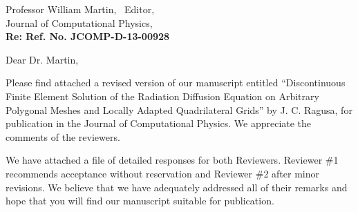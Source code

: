 \begin{letter}{Professor William Martin, \  Editor,\\
    Journal of Computational Physics,\\
\textbf{Re: Ref. No. JCOMP-D-13-00928}}





\date{\today}

\opening{Dear Dr. Martin,}
         \vspace{0.25cm}

Please find attached a revised version of our manuscript entitled
``Discontinuous Finite Element Solution of the Radiation Diffusion Equation on Arbitrary Polygonal Meshes and Locally Adapted Quadrilateral Grids'' 
by J. C. Ragusa, for
publication in the Journal of Computational Physics. We appreciate the comments of the reviewers. %

We have attached a file of detailed responses for both Reviewers. Reviewer \#1 recommends acceptance without reservation and Reviewer \#2 after minor revisions. 
We believe that we have adequately addressed all of their remarks and hope that you will find our manuscript suitable for publication.


\end{letter}
